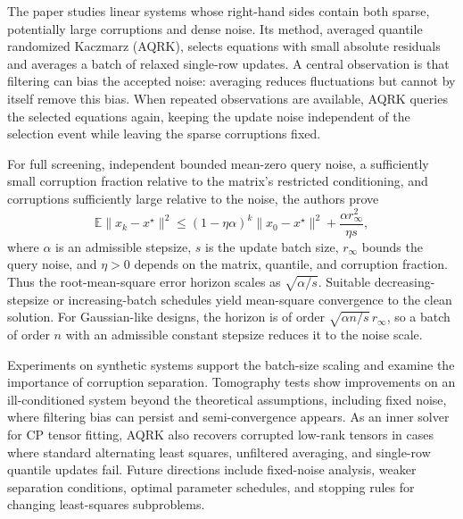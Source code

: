 \documentclass[11pt]{article}
\begin{document}
The paper studies linear systems whose right-hand sides contain both sparse,
potentially large corruptions and dense noise. Its method, averaged quantile
randomized Kaczmarz (AQRK), selects equations with small absolute residuals
and averages a batch of relaxed single-row updates. A central observation is
that filtering can bias the accepted noise: averaging reduces fluctuations
but cannot by itself remove this bias. When repeated observations are
available, AQRK queries the selected equations again, keeping the update
noise independent of the selection event while leaving the sparse
corruptions fixed.

For full screening, independent bounded mean-zero query noise, a sufficiently
small corruption fraction relative to the matrix's restricted conditioning,
and corruptions sufficiently large relative to the noise, the authors prove
\[
\mathbb E\|x_k-x^\star\|^2
\le (1-\eta\alpha)^k\|x_0-x^\star\|^2
+\frac{\alpha r_\infty^2}{\eta s},
\]
where $\alpha$ is an admissible stepsize, $s$ is the update batch size,
$r_\infty$ bounds the query noise, and $\eta>0$ depends on the matrix,
quantile, and corruption fraction. Thus the root-mean-square error horizon
scales as $\sqrt{\alpha/s}$. Suitable decreasing-stepsize or increasing-batch
schedules yield mean-square convergence to the clean solution. For
Gaussian-like designs, the horizon is of order
$\sqrt{\alpha n/s}\,r_\infty$, so a batch of order $n$ with an admissible
constant stepsize reduces it to the noise scale.

Experiments on synthetic systems support the batch-size scaling and examine
the importance of corruption separation. Tomography tests show improvements
on an ill-conditioned system beyond the theoretical assumptions, including
fixed noise, where filtering bias can persist and semi-convergence appears.
As an inner solver for CP tensor fitting, AQRK also recovers corrupted
low-rank tensors in cases where standard alternating least squares,
unfiltered averaging, and single-row quantile updates fail. Future directions
include fixed-noise analysis, weaker separation conditions, optimal parameter
schedules, and stopping rules for changing least-squares subproblems.
\par
\end{document}
